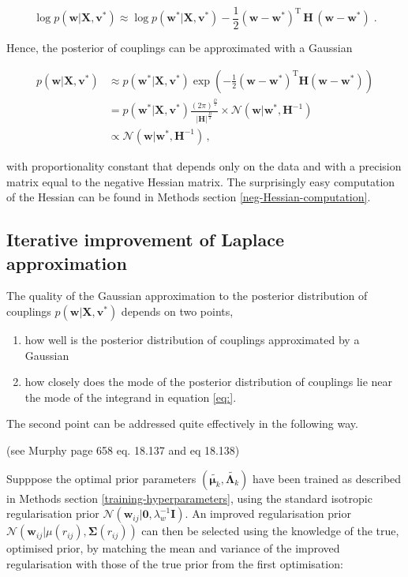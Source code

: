 \documentclass[12pt,a4paper,twoside]{book}
\providecommand{\tightlist}{%
  \setlength{\itemsep}{0pt}\setlength{\parskip}{0pt}}
\newcommand{\Gauss}{\mathcal{N}}
\renewcommand{\H}{\mathbf{H}}
\newcommand{\I}{\mathbf{I}}
\newcommand{\Lk}{\mathbf{\Lambda}_k}
\newcommand{\muk}{\mathbf{\mu}_k}
\renewcommand{\v}{\mathbf{v}}
\newcommand{\w}{\mathbf{w}}
\newcommand{\wij}{\mathbf{w}_{ij}}
\newcommand{\X}{\mathbf{X}}
\theoremstyle{definition}
\theoremstyle{definition}
\theoremstyle{remark}
\begin{document}
\begin{equation}
    \log p(\w | \X , \v^*) {\approx}  \log p(\w^* | \X , \v^*)  - \frac{1}{2} (\w-\w^*)^{\mathrm{T}} \, \H \, (\w-\w^*)  \;.
\end{equation}

Hence, the posterior of couplings can be approximated with a Gaussian

\begin{align}
   p(\w | \X , \v^*) &\approx p(\w^* | \X , \v^*) \exp \left( - \frac{1}{2} (\w-\w^*)^{\mathrm{T}} \H  (\w -\w^*) \right) \nonumber \\
              &= p(\w^* | \X , \v^*) \frac{(2 \pi)^\frac{D}{2}} { |\H|^\frac{D}{2}} \times \Gauss (\w | \w^*, \H^{-1} )  \\
              &\propto  \Gauss (\w | \w^*, \H^{-1}) \,,
\label{eq:reg-lik-gauss-approx}
\end{align}

with proportionality constant that depends only on the data and with a
precision matrix equal to the negative Hessian matrix. The surprisingly
easy computation of the Hessian can be found in Methods section
\ref{neg-Hessian-computation}.

\subsection{Iterative improvement of Laplace
approximation}\label{laplace-approx-improvement}

The quality of the Gaussian approximation to the posterior distribution
of couplings \(p(\w | \X , \v^*)\) depends on two points,

\begin{enumerate}
\def\labelenumi{\arabic{enumi}.}
\tightlist
\item
  how well is the posterior distribution of couplings approximated by a
  Gaussian
\item
  how closely does the mode of the posterior distribution of couplings
  lie near the mode of the integrand in equation \ref{eq:}.
\end{enumerate}

The second point can be addressed quite effectively in the following
way.

(see Murphy page 658 eq. 18.137 and eq 18.138)

Supppose the optimal prior parameters \((\tilde{\muk}, \tilde{\Lk})\)
have been trained as described in Methods section
\ref{training-hyperparameters}, using the standard isotropic
regularisation prior
\(\Gauss(\w_{ij} | \mathbf{0}, \lambda_w^{-1} \I)\). An improved
regularisation prior
\(\Gauss( \wij | \mu(r_{ij}), \mathbf{\Sigma}(r_{ij}))\) can then be
selected using the knowledge of the true, optimised prior, by matching
the mean and variance of the improved regularisation with those of the
true prior from the first optimisation:
\end{document}
